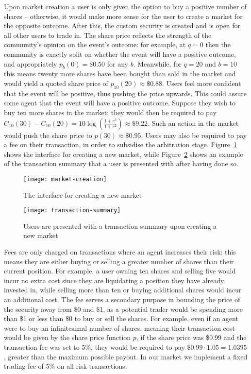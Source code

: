 Upon market creation a user is only given the option to buy a positive number
of shares -- otherwise, it would make more sense for the user to create a
market for the opposite outcome. After this, the custom security is created and
is open for all other users to trade in. The share price reflects the strength
of the community's opinion on the event's outcome: for example, at $q=0$ then
the community is exactly split on whether the event will have a positive
outcome, and appropriately $p_b(0)=\$0.50$ for any $b$. Meanwhile, for $q=20$
and $b=10$ this means twenty more shares have been bought than sold in the
market and would yield a quoted share price of $p_{10}(20) \approx \$0.88$.
Users feel more confident that the event will be positive, thus pushing the
price upwards. This could assure some agent that the event will have a positive
outcome. Suppose they wish to buy ten more shares in the market: they would
then be required to pay $C_{10}(30)-C_{10}(20)=10 \log (\frac{1+e^3}{1+e^2})
\approx \$9.22$. Such an action in the market would push the share price to
$p(30) \approx \$0.95$. Users may also be required to pay a fee on their
transaction, in order to subsidise the arbitration stage.
Figure~\ref{fig:marketCreation} shows the interface for creating a new market,
while Figure~\ref{fig:transactionSummary} shows an example of the transaction
summary that a user is presented with after having done so.

\begin{figure}[h]
	\centering
	\texttt{[image: market-creation]}
	\caption{The interface for creating a new market}
	\label{fig:marketCreation}
\end{figure}

\begin{figure}[h]
	\centering
	\texttt{[image: transaction-summary]}
	\caption{Users are presented with a transaction summary upon creating a new
	market}
	\label{fig:transactionSummary}
\end{figure}

Fees are only charged on transactions where an agent increases their risk: this
means they are either buying or selling a greater number of shares than their
current position. For example, a user owning ten shares and selling five would
incur no extra cost since they are liquidating a position they have already
invested in, while selling more than ten or buying additional shares would
incur an additional cost. The fee serves a secondary purpose in bounding the
price of the security away from \$0 and \$1, as a potential trader would be
spending more than \$1 or less than \$0 to buy or sell the shares. For example,
even if an agent were to buy an infinitesimal number of shares, meaning their
transaction cost would be given by the share price function $p$, if the share
price was \$0.99 and the transaction fee was set to 5\%, they would be required
to pay $\$0.99 \cdot 1.05 = 1.0395$, greater than the maximum possible payout.
In our market we implement a fixed trading fee of 5\% on all risk transactions.

